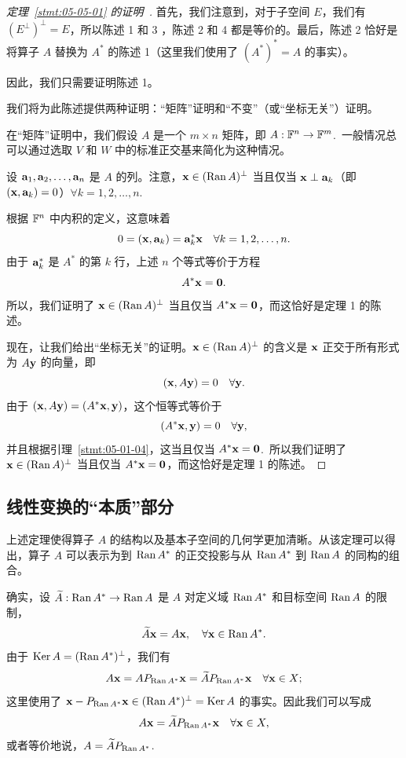 \begin{proof}[\normalfont\heiti 定理~\ref{stmt:05-05-01} 的证明~\nopunct]首先，我们注意到，对于子空间 $E$，我们有 $(E^\perp)^\perp = E$，所以陈述 1 和 3 ，陈述 2 和 4 都是等价的。最后，陈述 2 恰好是将算子 $A$ 替换为 $A^*$ 的陈述 1（这里我们使用了 $(A^*)^* = A$ 的事实）。

因此，我们只需要证明陈述 1。

我们将为此陈述提供两种证明：“矩阵”证明和“不变”（或“坐标无关”）证明。

在“矩阵”证明中，我们假设 $A$ 是一个 $m \times n$ 矩阵，即 $A: \mathbb{F}^n \to \mathbb{F}^m$.~一般情况总可以通过选取 $V$ 和 $W$ 中的标准正交基来简化为这种情况。

设 $\mathbf{a}_1, \mathbf{a}_2, \dots, \mathbf{a}_n$ 是 $A$ 的列。注意，$\mathbf{x} \in (\operatorname{Ran} A)^\perp$ 当且仅当 $\mathbf{x} \perp \mathbf{a}_k$（即 $(\mathbf{x}, \mathbf{a}_k) = 0$）$\forall k = 1, 2, \dots, n$.~

根据 $\mathbb{F}^n$ 中内积的定义，这意味着
$$0 = (\mathbf{x}, \mathbf{a}_k) = \mathbf{a}_k^* \mathbf{x} \quad \forall k = 1, 2, \dots, n.$$
由于 $\mathbf{a}_k^*$ 是 $A^*$ 的第 $k$ 行，上述 $n$ 个等式等价于方程
$$A^*\mathbf{x} = \mathbf{0}.$$
所以，我们证明了 $\mathbf{x} \in (\operatorname{Ran} A)^\perp$ 当且仅当 $A^*\mathbf{x} = \mathbf{0}$，而这恰好是定理 1 的陈述。

现在，让我们给出“坐标无关”的证明。$\mathbf{x} \in (\operatorname{Ran} A)^\perp$ 的含义是 $\mathbf{x}$ 正交于所有形式为 $A\mathbf{y}$ 的向量，即
$$(\mathbf{x}, A\mathbf{y}) = 0 \quad \forall \mathbf{y}.$$
由于 $(\mathbf{x}, A\mathbf{y}) = (A^*\mathbf{x}, \mathbf{y})$，这个恒等式等价于
$$(A^*\mathbf{x}, \mathbf{y}) = 0 \quad \forall \mathbf{y},$$
并且根据引理~\ref{stmt:05-01-04}，这当且仅当 $A^*\mathbf{x} = \mathbf{0}$.~所以我们证明了 $\mathbf{x} \in (\operatorname{Ran} A)^\perp$ 当且仅当 $A^*\mathbf{x} = \mathbf{0}$，而这恰好是定理 1 的陈述。\end{proof}

\subsection{线性变换的“本质”部分}\label{sec:05-05-03}

上述定理使得算子 $A$ 的结构以及基本子空间的几何学更加清晰。从该定理可以得出，算子 $A$ 可以表示为到 $\operatorname{Ran} A^*$ 的正交投影与从 $\operatorname{Ran} A^*$ 到 $\operatorname{Ran} A$ 的同构的组合。

确实，设 $\widetilde{A}: \operatorname{Ran} A^* \to \operatorname{Ran} A$ 是 $A$ 对定义域 $\operatorname{Ran} A^*$ 和目标空间 $\operatorname{Ran} A$ 的限制，
$$\widetilde{A}\mathbf{x} = A\mathbf{x}, \quad \forall \mathbf{x} \in \operatorname{Ran} A^*.$$
由于 $\operatorname{Ker} A = (\operatorname{Ran} A^*)^\perp$，我们有
$$A\mathbf{x} = AP_{\operatorname{Ran} A^*}\mathbf{x} = \widetilde{A}P_{\operatorname{Ran} A^*}\mathbf{x} \quad \forall \mathbf{x} \in X;$$
这里使用了 $\mathbf{x} - P_{\operatorname{Ran} A^*}\mathbf{x} \in (\operatorname{Ran} A^*)^\perp = \operatorname{Ker} A$ 的事实。因此我们可以写成
\begin{equation}\label{eq:05-05-01}
A\mathbf{x} = \widetilde{A}P_{\operatorname{Ran} A^*}\mathbf{x} \quad \forall \mathbf{x} \in X,
\end{equation}
或者等价地说，$A = \widetilde{A}P_{\operatorname{Ran} A^*}$.~

